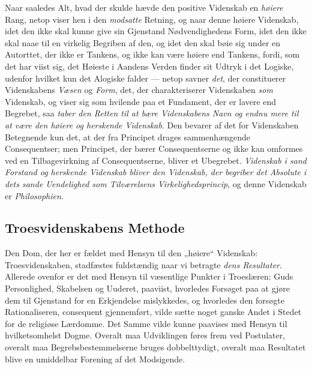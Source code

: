 \documentclass[12pt,a4paper]{book}
\newcommand{\opage}[1]{\marginnote{\footnotesize\textit{[#1]}}}
\begin{document}
Naar saaledes Alt, hvad der skulde hævde den positive Videnskab en \emph{høiere} Rang, netop viser hen i den \emph{modsatte} Retning, og naar denne høiere Videnskab, idet den ikke skal kunne
give sin Gjenstand Nødvendighedens Form, idet den ikke skal naae til en virkelig Begriben
af den, og idet den skal bøie sig under en Autorttet, der ikke er Tankens, og ikke kan
være høiere end Tankens, fordi, som det har viist sig, det Høieste i Aandens Verden finder
sit Udtryk i det Logiske, udenfor hvilket kun det Alogiske falder --- netop savner \emph{det}, der constituerer Videnskabens \emph{Væsen} og \emph{Form}, det, der charakteriserer Videnskaben \emph{som} Videnskab, og viser sig som hvilende paa et Fundament, der er lavere end Begrebet, saa \emph{taber den Retten til at bære Videnskabens Navn og endnu mere til at være den høiere
og herskende Videnskab}. Den bevarer af det for Videnskaben Betegnende kun det, at der fra
Principet drages sammenhængende Consequentser; men Principet, der bærer Consequentserne og
ikke kan omformes ved en Tilbagevirkning af Consequentserne, bliver et Ubegrebet.
\emph{Videnskab i sand Forstand og herskende Videnskab bliver den Videnskab, der begriber
det Absolute i dets sande Uendelighed som Tilværelsens Virkelighedsprincip}, og denne
Videnskab er \emph{Philosophien}.

\subsection{Troesvidenskabens Methode}
\label{ssec:methode}

Den Dom, der her er fældet med Hensyn til den „høiere“ Videnskab: Troesvidenskaben,
stadfæstes fuldstændig naar vi betragte \emph{dens Resultater}. Allerede ovenfor er det med
Hensyn til væsentlige Punkter i Troeslæren: Guds Personlighed, Skabelsen og Uuderet,
paaviist, hvorledes Forsøget paa at gjøre dem til Gjenstand for en Erkjendelse mislykkedes,
og hvorledes den forsøgte Rationaliseren, consequent gjennemført, vilde sætte noget ganske
Andet i Stedet \opage{110}for de religiøse Lærdomme. Det Samme vilde kunne paavises med Hensyn til
hvilketsomhelst Dogme. Overalt maa Udviklingen føres frem ved Postulater, overalt maa
Begrebsbestemmelserne bruges dobbelttydigt, overalt maa Resultatet blive en umiddelbar
Forening af det Modsigende.
\end{document}
